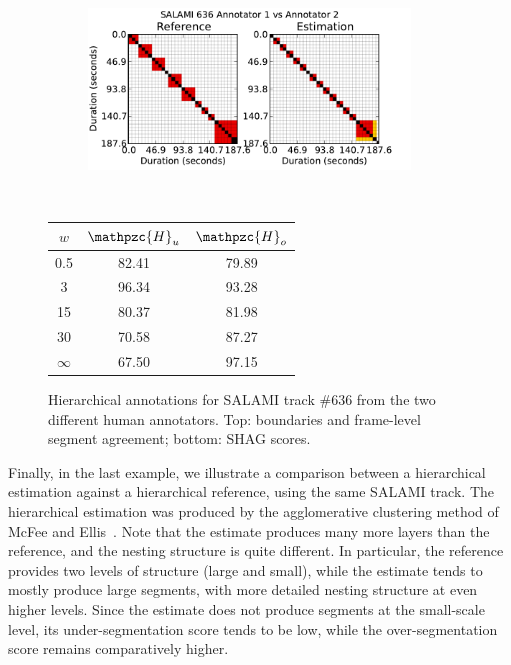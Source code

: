 \documentclass{article}
\def\shag{\ensuremath{\mathpzc{H}}}
\begin{document}
\begin{figure}[t]
  \centering
  \begin{subfigure}{0.5\textwidth}
    \centering
    \includegraphics[width=0.94\textwidth]{plots/SALAMI-SALAMI.pdf}
  \end{subfigure}%
  \\
  \begin{minipage}{0.5\textwidth}
    \centering
    \vspace{10pt}
    \begin{tabular}{|c|c|c|}
      \hline
      $w$       & $\shag_u$       & $\shag_o$      \\
      \hline
      0.5       & 82.41       & 79.89      \\     
      3         & 96.34       & 93.28      \\
      15        & 80.37       & 81.98    \\
      30        & 70.58       & 87.27    \\
      $\infty$  & 67.50       & 97.15    \\
      \hline
    \end{tabular}
  \end{minipage}
  \caption{Hierarchical annotations for SALAMI track \#636 from the two different human annotators. Top: boundaries and frame-level segment agreement; bottom: SHAG scores.}
  \label{fig:SALAMI-SALAMI}
\end{figure}

Finally, in the last example, we illustrate a comparison between a hierarchical estimation against a hierarchical reference, using the same SALAMI track.  The hierarchical estimation
was produced by the agglomerative clustering method of McFee and
Ellis~\cite{McFee2014}.  Note that the estimate produces many more layers than the
reference, and the nesting structure is quite different.  In particular, the reference
provides two levels of structure (large and small), while the estimate tends to mostly
produce large segments, with more detailed nesting structure at even higher levels.
Since the estimate does not produce segments at the small-scale level, its
under-segmentation score tends to be low, while the over-segmentation score remains
comparatively higher.
\end{document}

